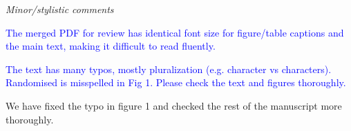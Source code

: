 \documentclass[12pt,letterpaper]{article}
\renewcommand{\subsection}[1]{%
\bigskip
\begin{center}
\begin{large}
\normalfont\itshape #1
\end{large}
\end{center}}
\begin{document}
\subsection{Minor/stylistic comments}

\textcolor{blue}{The merged PDF for review has identical font size for figure/table captions and the main text, making it difficult to read fluently.}


\textcolor{blue}{The text has many typos, mostly pluralization (e.g. character vs characters). Randomised is misspelled in Fig 1. Please check the text and figures thoroughly.}

We have fixed the typo in figure 1 and checked the rest of the manuscript more thoroughly.




\end{document}
